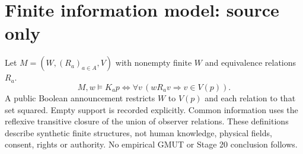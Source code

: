\documentclass{article}
\begin{document}
\section*{Finite information model: source only}
Let $M=(W,(R_a)_{a\in A},V)$ with nonempty finite $W$ and equivalence relations $R_a$.\[M,w\models K_a p\iff \forall v\,(wR_av\Rightarrow v\in V(p)).\]
A public Boolean announcement restricts $W$ to $V(p)$ and each relation to that set squared. Empty support is recorded explicitly. Common information uses the reflexive transitive closure of the union of observer relations. These definitions describe synthetic finite structures, not human knowledge, physical fields, consent, rights or authority. No empirical GMUT or Stage 20 conclusion follows.
\end{document}
